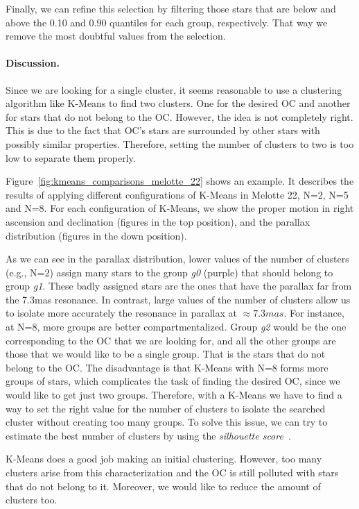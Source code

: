 \documentclass[11pt,a4paper,english,twocolumn]{article}
\begin{document}
Finally, we can refine this selection by filtering those stars that are below and above
the 0.10 and 0.90 quantiles for each group, respectively. That way we remove the most
doubtful values from the selection.

\paragraph{Discussion.}

Since we are looking for a single cluster, it seems reasonable to use a clustering algorithm
like K-Means to find two clusters. One for the desired OC and another for stars that do not
belong to the OC. However, the idea is not completely right. This is due to the fact that OC's
stars are surrounded by other stars with possibly similar properties. Therefore, setting the
number of clusters to two is too low to separate them properly.

Figure~\ref{fig:kmeans_comparisons_melotte_22} shows an example. It describes the results of
applying different configurations of K-Means in Melotte 22, N=2, N=5 and N=8. For each configuration
of K-Means, we show the proper motion in right ascension and declination (figures in the top position),
and the parallax distribution (figures in the down position).

As we can see in the parallax distribution, lower values of the number of clusters (e.g., N=2) assign
many stars to the group \emph{g0} (purple) that should belong to group \emph{g1}. These badly assigned stars
are the ones that have the parallax far from the 7.3mas resonance. In contrast, large values of the
number of clusters allow us to isolate more accurately the resonance in parallax at \(\approx 7.3mas\).
For instance, at N=8, more groups are better compartmentalized. Group \emph{g2} would be the one corresponding
to the OC that we are looking for, and all the other groups are those that we would like to be a single
group. That is the stars that do not belong to the OC. The disadvantage is that K-Means with N=8 forms more
groups of stars, which complicates the task of finding the desired OC, since we would like to get just two
groups. Therefore, with a K-Means we have to find a way to set the right value for the number of clusters
to isolate the searched cluster without creating too many groups. To solve this issue, we can try to
estimate the best number of clusters by using the \emph{silhouette score}~\cite{rousseeuw1987silhouettes}.

K-Means does a good job making an initial clustering. However, too many clusters arise
from this characterization and the OC is still polluted with stars that do not belong to it.
Moreover, we would like to reduce the amount of clusters too.
\end{document}
